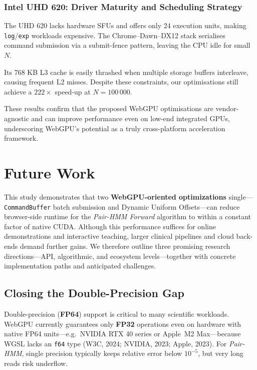 \documentclass[PhD]{PHlab-thesis}
\begin{document}
\subsection{Intel UHD 620: Driver Maturity and Scheduling Strategy}
The UHD 620 lacks hardware SFUs and offers only 24 execution units, making \texttt{log}/\texttt{exp} workloads expensive.  
The Chrome–Dawn–DX12 stack serialises command submission via a submit-fence pattern, leaving the CPU idle for small $N$.

Its 768 KB L3 cache is easily thrashed when multiple storage buffers interleave, causing frequent L2 misses.  
Despite these constraints, our optimisations still achieve a $222\times$ speed-up at $N = 100\,000$.

These results confirm that the proposed WebGPU optimisations are vendor-agnostic and can improve performance even on low-end integrated GPUs, underscoring WebGPU’s potential as a truly cross-platform acceleration framework.




\chapter{Future Work}

This study demonstrates that two \textbf{WebGPU-oriented optimizations} single—\texttt{CommandBuffer} batch submission and Dynamic Uniform Offsets—can reduce browser-side runtime for the \emph{Pair-HMM Forward} algorithm to within a constant factor of native CUDA. Although this performance suffices for online demonstrations and interactive teaching, larger clinical pipelines and cloud back-ends demand further gains. We therefore outline three promising research directions—API, algorithmic, and ecosystem levels—together with concrete implementation paths and anticipated challenges.

\section{Closing the Double-Precision Gap}

Double-precision (\textbf{FP64}) support is critical to many scientific workloads. WebGPU currently guarantees only \textbf{FP32} operations even on hardware with native FP64 units—e.g.\ NVIDIA RTX 40 series or Apple~M2 Max—because WGSL lacks an \texttt{f64} type (W3C, 2024; NVIDIA, 2023; Apple, 2023). For \emph{Pair-HMM}, single precision typically keeps relative error below $10^{-5}$, but very long reads risk underflow.
\end{document}

